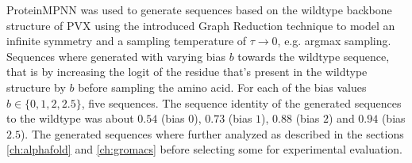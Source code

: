 ProteinMPNN was used to generate sequences based on the wildtype backbone structure of PVX using the introduced Graph Reduction technique to model an infinite symmetry and a sampling temperature of $\tau\rightarrow 0$, e.g. argmax sampling. Sequences where generated with varying bias $b$ towards the wildtype sequence, that is by increasing the logit of the residue that's present in the wildtype structure by $b$ before sampling the amino acid. For each of the bias values $b \in \{0, 1, 2, 2.5\}$, five sequences. The sequence identity of the generated sequences to the wildtype was about $0.54$ (bias $0$), $0.73$ (bias $1$), $0.88$ (bias $2$) and $0.94$ (bias $2.5$). The generated sequences where further analyzed as described in the sections \ref{ch:alphafold} and \ref{ch:gromacs} before selecting some for experimental evaluation. 